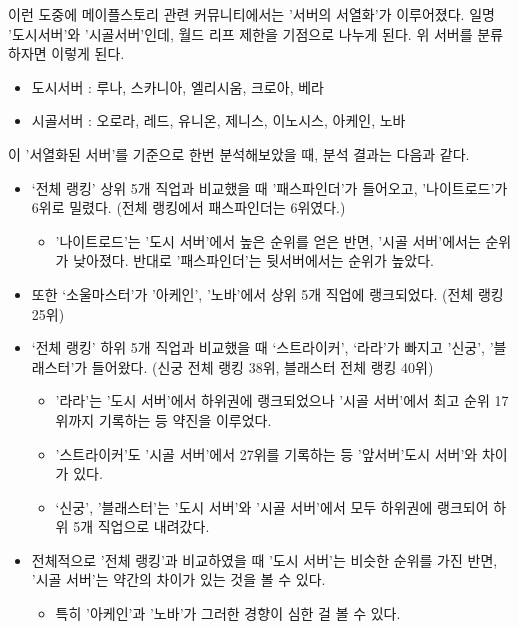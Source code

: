 \documentclass[
]{article}
\providecommand{\tightlist}{%
  \setlength{\itemsep}{0pt}\setlength{\parskip}{0pt}}
\begin{document}
이런 도중에 메이플스토리 관련 커뮤니티에서는 '서버의 서열화'가
이루어졌다. 일명 '도시서버'와 '시골서버'인데, 월드 리프 제한을 기점으로
나누게 된다. 위 서버를 분류하자면 이렇게 된다.

\begin{itemize}
\item
  도시서버 : 루나, 스카니아, 엘리시움, 크로아, 베라
\item
  시골서버 : 오로라, 레드, 유니온, 제니스, 이노시스, 아케인, 노바
\end{itemize}

이 '서열화된 서버'를 기준으로 한번 분석해보았을 때, 분석 결과는 다음과
같다.

\begin{itemize}
\item
  `전체 랭킹' 상위 5개 직업과 비교했을 때 '패스파인더'가 들어오고,
  '나이트로드'가 6위로 밀렸다. (전체 랭킹에서 패스파인더는 6위였다.)

  \begin{itemize}
  \tightlist
  \item
    '나이트로드'는 '도시 서버'에서 높은 순위를 얻은 반면, '시골
    서버'에서는 순위가 낮아졌다. 반대로 '패스파인더'는 뒷서버에서는
    순위가 높았다.
  \end{itemize}
\item
  또한 `소울마스터'가 '아케인', '노바'에서 상위 5개 직업에 랭크되었다.
  (전체 랭킹 25위)
\item
  `전체 랭킹' 하위 5개 직업과 비교했을 때 `스트라이커', `라라'가 빠지고
  '신궁', '블래스터'가 들어왔다. (신궁 전체 랭킹 38위, 블래스터 전체
  랭킹 40위)

  \begin{itemize}
  \tightlist
  \item
    '라라'는 '도시 서버'에서 하위권에 랭크되었으나 '시골 서버'에서 최고
    순위 17위까지 기록하는 등 약진을 이루었다.
  \item
    '스트라이커'도 '시골 서버'에서 27위를 기록하는 등 '앞서버'도시
    서버'와 차이가 있다.
  \item
    `신궁', '블래스터'는 '도시 서버'와 '시골 서버'에서 모두 하위권에
    랭크되어 하위 5개 직업으로 내려갔다.
  \end{itemize}
\item
  전체적으로 '전체 랭킹'과 비교하였을 때 '도시 서버'는 비슷한 순위를
  가진 반면, '시골 서버'는 약간의 차이가 있는 것을 볼 수 있다.

  \begin{itemize}
  \tightlist
  \item
    특히 '아케인'과 '노바'가 그러한 경향이 심한 걸 볼 수 있다.
  \end{itemize}
\end{itemize}
\end{document}

